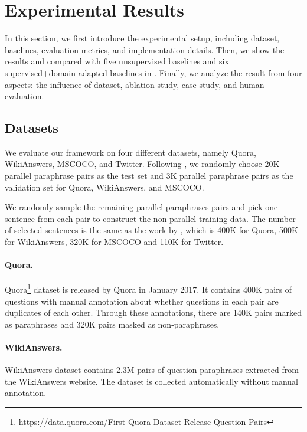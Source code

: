 \section{Experimental Results}

In this section, we first introduce the experimental setup, including dataset, baselines, evaluation metrics, and implementation details. Then, we show the results and compared with five unsupervised baselines and six supervised+domain-adapted baselines in . Finally, we analyze the result from four aspects: the influence of dataset, ablation study, case study, and human evaluation.
\subsection{Datasets}
We evaluate our framework on four different datasets, namely Quora, WikiAnswers, MSCOCO, and Twitter. Following \citet{liu2019unsupervised}, we randomly choose 20K parallel paraphrase pairs as the test set and 3K parallel paraphrase pairs as the validation set for Quora, WikiAnswers, and MSCOCO. 

We randomly sample the remaining parallel paraphrases pairs and pick one sentence from each pair to construct the non-parallel training data.
The number of selected sentences is the same as the work by \citet{liu2019unsupervised}, which is 400K for Quora, 500K for WikiAnswers, 320K for MSCOCO and 110K for Twitter.

\paragraph{Quora. } Quora\footnote{\url{https://data.quora.com/First-Quora-Dataset-Release-Question-Pairs}} dataset is released by Quora in
January 2017. It contains 400K pairs of questions with manual annotation about whether questions in each pair are duplicates of each other. Through these annotations, there are 140K pairs marked as paraphrases and 320K pairs masked as non-paraphrases.

\paragraph{WikiAnswers. } WikiAnswers \citep{fader2013paraphrase} dataset contains 2.3M pairs of question paraphrases extracted from the WikiAnswers website. The dataset is collected automatically without manual annotation.

